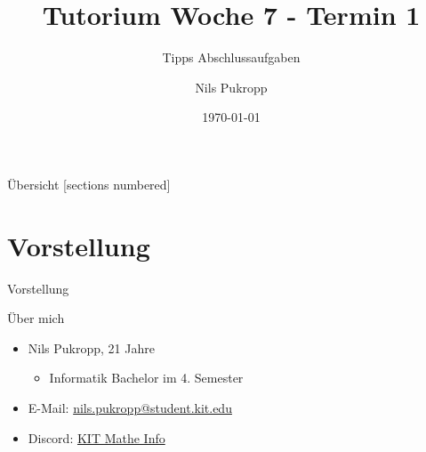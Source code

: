 \documentclass[aspectratio=169]{beamer}
\title{\color{classcolor}Tutorium Woche 7 - Termin 1}
\subtitle{Tipps Abschlussaufgaben}
\date{\today}
\author{Nils Pukropp}
\institute{INSTITUT FÜR PROGRAMMSTRUKTUREN UND DATENORGANISATION}
\begin{document}
\maketitle

\begin{frame}{Übersicht}
  [sections numbered]
  \tableofcontents[hideallsubsections]
\end{frame}

\section{Vorstellung}
\begin{frame}[fragile]{Vorstellung}
  \begin{block}{Über mich}
  \begin{itemize}
    \item Nils Pukropp, 21 Jahre
    \begin{itemize}
      \item Informatik Bachelor im 4. Semester
    \end{itemize}
    \item E-Mail: \href{mailto:nils.pukropp@student.kit.edu}{nils.pukropp@student.kit.edu}
    \item Discord: \href{https://discord.gg/6GpaFE8w4y}{KIT Mathe Info}
  \end{itemize}
\end{block}
\end{frame}
\end{document}
